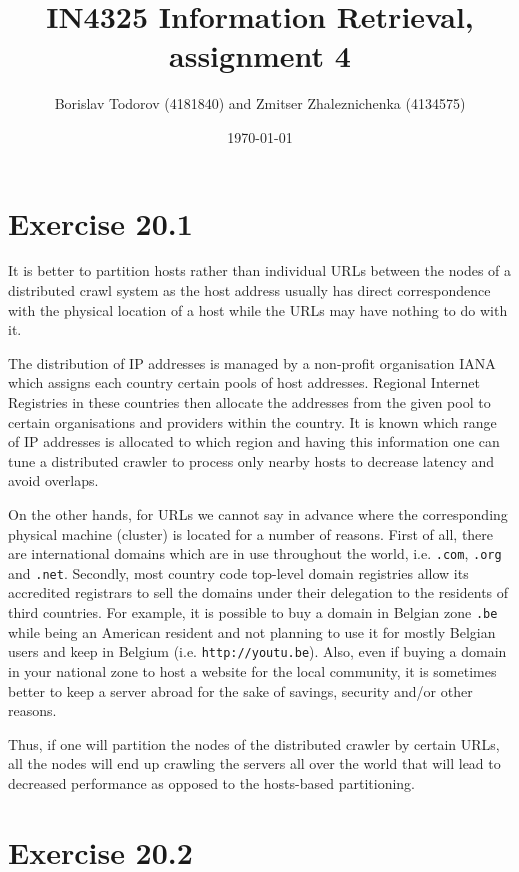\documentclass[a4paper, notitlepage]{article}
\begin{document}
\title{IN4325 Information Retrieval, assignment 4}
\author{Borislav Todorov (4181840) and Zmitser Zhaleznichenka (4134575)}
\date{\today}
\maketitle

\section{Exercise 20.1}

It is better to partition hosts rather than individual URLs between the nodes of a distributed crawl system as the host address usually has direct correspondence with the physical location of a host while the URLs may have nothing to do with it. 

The distribution of IP addresses is managed by a non-profit organisation IANA which assigns each country certain pools of host addresses. Regional Internet Registries in these countries then allocate the addresses from the given pool to certain organisations and providers within the country. It is known which range of IP addresses is allocated to which region and having this information one can tune a distributed crawler to process only nearby hosts to decrease latency and avoid overlaps. 

On the other hands, for URLs we cannot say in advance where the corresponding physical machine (cluster) is located for a number of reasons. First of all, there are international domains which are in use throughout the world, i.e. \lstinline{.com}, \lstinline{.org} and \lstinline{.net}. Secondly, most country code top-level domain registries allow its accredited registrars to sell the domains under their delegation to the residents of third countries. For example, it is possible to buy a domain in Belgian zone \lstinline{.be} while being an American resident and not planning to use it for mostly Belgian users and keep in Belgium (i.e. \lstinline{http://youtu.be}). Also, even if buying a domain in your national zone to host a website for the local community, it is sometimes better to keep a server abroad for the sake of savings, security and/or other reasons.

Thus, if one will partition the nodes of the distributed crawler by certain URLs, all the nodes will end up crawling the servers all over the world that will lead to decreased performance as opposed to the hosts-based partitioning. 

\section{Exercise 20.2}
\end{document}
